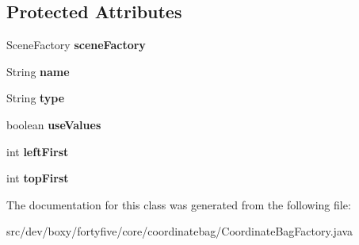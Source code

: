 \subsection*{Protected Attributes}
\begin{DoxyCompactItemize}
\item 
\hypertarget{classdev_1_1boxy_1_1fortyfive_1_1core_1_1coordinatebag_1_1_coordinate_bag_factory_a7e94fed6caa58a66bc212a04e8f439a1}{
SceneFactory {\bfseries sceneFactory}}
\label{dc/d0d/classdev_1_1boxy_1_1fortyfive_1_1core_1_1coordinatebag_1_1_coordinate_bag_factory_a7e94fed6caa58a66bc212a04e8f439a1}

\item 
\hypertarget{classdev_1_1boxy_1_1fortyfive_1_1core_1_1coordinatebag_1_1_coordinate_bag_factory_a9b262620d52c9f0dcc1bfc3344538dec}{
String {\bfseries name}}
\label{dc/d0d/classdev_1_1boxy_1_1fortyfive_1_1core_1_1coordinatebag_1_1_coordinate_bag_factory_a9b262620d52c9f0dcc1bfc3344538dec}

\item 
\hypertarget{classdev_1_1boxy_1_1fortyfive_1_1core_1_1coordinatebag_1_1_coordinate_bag_factory_ad69ee73bd7c807c2c1a92204e1c4ee28}{
String {\bfseries type}}
\label{dc/d0d/classdev_1_1boxy_1_1fortyfive_1_1core_1_1coordinatebag_1_1_coordinate_bag_factory_ad69ee73bd7c807c2c1a92204e1c4ee28}

\item 
\hypertarget{classdev_1_1boxy_1_1fortyfive_1_1core_1_1coordinatebag_1_1_coordinate_bag_factory_aa97e83bfd8439a245c123bac5173ecdd}{
boolean {\bfseries useValues}}
\label{dc/d0d/classdev_1_1boxy_1_1fortyfive_1_1core_1_1coordinatebag_1_1_coordinate_bag_factory_aa97e83bfd8439a245c123bac5173ecdd}

\item 
\hypertarget{classdev_1_1boxy_1_1fortyfive_1_1core_1_1coordinatebag_1_1_coordinate_bag_factory_a942682bc15adcc94c57ce8ede259c6a7}{
int {\bfseries leftFirst}}
\label{dc/d0d/classdev_1_1boxy_1_1fortyfive_1_1core_1_1coordinatebag_1_1_coordinate_bag_factory_a942682bc15adcc94c57ce8ede259c6a7}

\item 
\hypertarget{classdev_1_1boxy_1_1fortyfive_1_1core_1_1coordinatebag_1_1_coordinate_bag_factory_aa1179d8b572ce3a6f827e342d4d33475}{
int {\bfseries topFirst}}
\label{dc/d0d/classdev_1_1boxy_1_1fortyfive_1_1core_1_1coordinatebag_1_1_coordinate_bag_factory_aa1179d8b572ce3a6f827e342d4d33475}

\end{DoxyCompactItemize}


The documentation for this class was generated from the following file:\begin{DoxyCompactItemize}
\item 
src/dev/boxy/fortyfive/core/coordinatebag/CoordinateBagFactory.java\end{DoxyCompactItemize}
